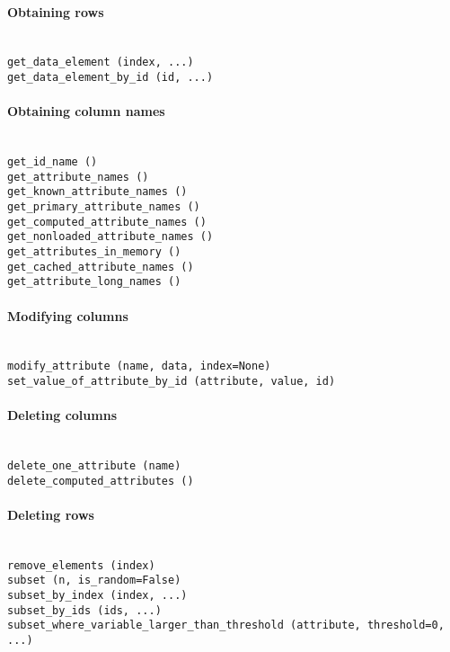 \paragraph{Obtaining rows}~\\[1mm]
{\tt get\_data\_element (index, ...)} \\
{\tt get\_data\_element\_by\_id (id, ...)}

\paragraph{Obtaining column names}~\\[1mm]
{\tt get_id_name ()} \\
{\tt get_attribute_names ()} \\
{\tt get_known_attribute_names ()} \\
{\tt get_primary_attribute_names ()} \\
{\tt get_computed_attribute_names ()} \\
{\tt get_nonloaded_attribute_names ()} \\
{\tt get_attributes_in_memory ()} \\
{\tt get_cached_attribute_names ()} \\
{\tt get_attribute_long_names ()}

\paragraph{Modifying columns}~\\[1mm]
{\tt modify\_attribute (name, data, index=None)} \\
{\tt set\_value\_of\_attribute\_by\_id (attribute, value, id)}

\paragraph{Deleting columns}~\\[1mm]
{\tt delete\_one\_attribute (name)} \\
{\tt delete\_computed\_attributes ()}

 \paragraph{Deleting rows}~\\[1mm]
 {\tt remove\_elements (index)}\\
 {\tt subset (n, is_random=False)}\\
 {\tt subset\_by\_index (index, ...)}\\
 {\tt subset\_by\_ids (ids, ...)}\\
 {\tt subset\_where\_variable\_larger\_than_threshold (attribute, threshold=0, ...)}
 
